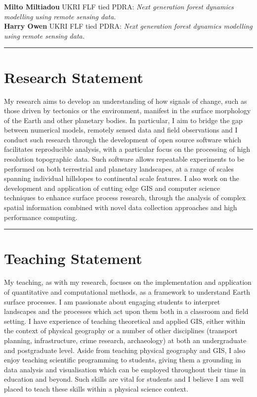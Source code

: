 \documentclass[10pt, a4paper]{article}
\newcommand{\years}[1]{\marginnote{\scriptsize #1}}
\begin{document}
\years{2022--} \textbf{Milto Miltiadou} UKRI FLF tied PDRA: \textit{Next generation forest dynamics modelling using remote sensing data.}\\[0.05cm]
\years{2021--} \textbf{Harry Owen} UKRI FLF tied PDRA: \textit{Next generation forest dynamics modelling using remote sensing data.}\\[0.05cm]


\iflong

  \hrule
  \section*{Research Statement}
  \noindent

  My research aims to develop an understanding of how signals of change, such as those driven by tectonics or the environment, manifest in the surface morphology of the Earth and other planetary bodies. In particular, I aim to bridge the gap between numerical models, remotely sensed data and field observations and I conduct such research through the development of open source software which facilitates reproducible analysis, with a particular focus on the processing of high resolution topographic data. Such software allows repeatable experiments to be performed on both terrestrial and planetary landscapes, at a range of scales spanning individual hillslopes to continental scale features. I also work on the development and application of cutting edge GIS and computer science techniques to enhance surface process research, through the analysis of complex spatial information combined with novel data collection approaches and high performance computing.\\[0.05cm]

  \hrule
  \section*{Teaching Statement}
  \noindent

  My teaching, as with my research, focuses on the implementation and application of quantitative and computational methods, as a framework to understand Earth surface processes. I am passionate about engaging students to interpret landscapes and the processes which act upon them both in a classroom and field setting. I have experience of teaching theoretical and applied GIS, either within the context of physical geography or a number of other disciplines (transport planning, infrastructure, crime research, archaeology) at both an undergraduate and postgraduate level. Aside from teaching physical geography and GIS, I also enjoy teaching scientific programming to students, giving them a grounding in data analysis and visualisation which can be employed throughout their time in education and beyond. Such skills are vital for students and I believe I am well placed to teach these skills within a physical science context.\\[0.05cm]
\end{document}
